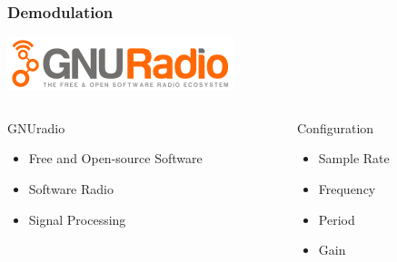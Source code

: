 
\begin{frame}
	\frametitle{Demodulation}
	\centering \includegraphics[scale=.13]{images/gnuradio_logo.png}

	\begin{columns}[c] %
		\begin{column}{.28\textwidth}
			\begin{block}{GNUradio}
				\begin{itemize}
					\item Free and Open-source Software
					\item Software Radio
					\item Signal Processing
				\end{itemize}
			\end{block}
		\end{column}%
		\hfill%
		\begin{column}{.5\textwidth}
			\begin{block}{Configuration}
				\begin{itemize}
					\item Sample Rate 
					\item Frequency
					\item Period
					\item Gain
				\end{itemize}
			\end{block}
		\end{column}%
	\end{columns}
\end{frame}

